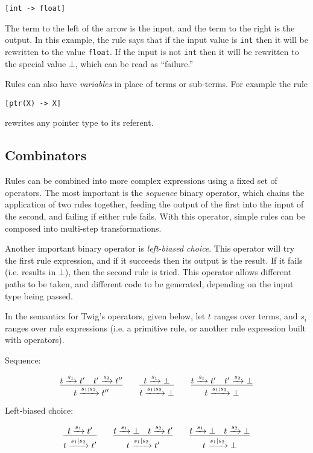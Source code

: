 \begin{verbatim}
[int -> float]
\end{verbatim}

The term to the left of the arrow is the input, and the term to the right is
the output. In this example, the rule says that if the input value is
\texttt{int} then it will be rewritten to the value \texttt{float}. If the
input is not \texttt{int} then it will be rewritten to the special value
$\bot$, which can be read as ``failure.''

Rules can also have \emph{variables} in place of terms or sub-terms. For
example the rule

\begin{verbatim}
[ptr(X) -> X]
\end{verbatim}

rewrites any pointer type to its referent.

\subsection{Combinators}

Rules can be combined into more complex expressions using a fixed set of
operators. The most important is the \emph{sequence} binary operator, which
chains the application of two rules together, feeding the output of the first
into the input of the second, and failing if either rule fails. With this
operator, simple rules can be composed into multi-step transformations.

Another important binary operator is \emph{left-biased choice}. This operator
will try the first rule expression, and if it succeeds then its output is the
result. If it fails (i.e. results in $\bot$), then the second rule is tried.
This operator allows different paths to be taken, and different code to be
generated, depending on the input type being passed.

In the semantics for Twig's operators, given below, let $t$ ranges over terms,
and $s_i$ ranges over rule expressions (i.e. a primitive rule, or another rule
expression built with operators).

Sequence:

\[
\infer{t \arr{s_1;s_2} t''}{t \arr{s_1} t' \quad t' \arr{s_2} t''}
\qquad 
\infer{t \arr{s_1;s_2} \bot}{t \arr{s_1} \bot}
\qquad
\infer{t \arr{s_1;s_2} \bot}{t \arr{s_1} t' \quad t' \arr{s_2} \bot}
\]

Left-biased choice:

\[
\infer{t \arr{s_1|s_2} t'}{t \arr{s_1} t'}
\qquad 
\infer{t \arr{s_1|s_2} t'}{t \arr{s_1} \bot \quad t \arr{s_2} t'}
\qquad
\infer{t \arr{s_1|s_2} \bot}{t \arr{s_1} \bot \quad t \arr{s_2} \bot}
\]

